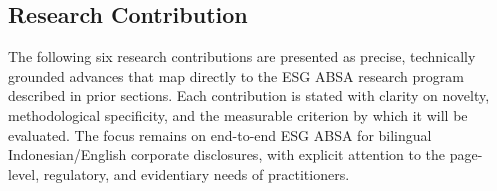\subsection{Research Contribution}

The following six research contributions are presented as precise, technically grounded advances that map directly to the ESG ABSA research program described in prior sections. Each contribution is stated with clarity on novelty, methodological specificity, and the measurable criterion by which it will be evaluated. The focus remains on end-to-end ESG ABSA for bilingual Indonesian/English corporate disclosures, with explicit attention to the page-level, regulatory, and evidentiary needs of practitioners.



